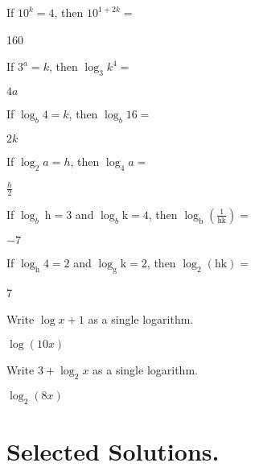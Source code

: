 \documentclass[12pt,fleqn]{book}
\newcommand{\prb}[1]{\begin{Exercise}#1\end{Exercise}}
\newcommand{\sol}[1]{\begin{Answer}#1\end{Answer}}
\begin{document}
\prb {If $10^k=4$, then $10^{1+2 k}=$}
\sol{160}  
\prb {If $3^a=k$, then $\log _3 k^4=$}
\sol{$4a$}  
\prb {If $\log _b 4=k$, then $\log _b 16=$}
\sol{$2k$}  
\prb {If $\log _2 a=h$, then $\log _4 a=$}
\sol{$\frac h2$}  
\prb {If $\log _b \mathrm{~h}=3$ and $\log _b \mathrm{k}=4$, then $\log _{\mathrm{b}}\left(\frac{1}{\mathrm{hk}}\right)=$}
\sol{$-7$ }  
\prb {If $\log _{\mathrm{h}} 4=2$ and $\log _{\mathrm{g}} \mathrm{k}=2$, then $\log _2(\mathrm{hk})=$}
\sol{7 }  
\prb {Write $\log x+1$ as a single logarithm.}
\sol{$\log(10x)$ }  
\prb {Write $3+\log _2 x$ as a single logarithm.}
\sol{ $\log_2(8x)$}  
\chapter{Selected Solutions.}
\shipoutAnswer
\end{document}
